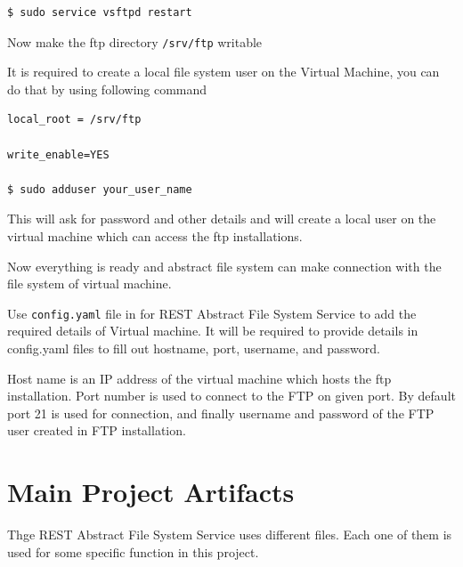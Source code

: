 \begin{verbatim}
$ sudo service vsftpd restart
\end{verbatim}



Now make the ftp directory \verb|/srv/ftp| writable 


It is required to create a local file system user on the Virtual
Machine, you can do that by using following command

\begin{verbatim}
local_root = /srv/ftp  

write_enable=YES       

$ sudo adduser your_user_name    
\end{verbatim}

This will ask for password and other details and will create a local
user on the virtual machine which can access the ftp installations.

Now everything is ready and abstract file system can make connection
with the file system of virtual machine.





Use \verb|config.yaml| file in for REST Abstract File System Service
to add the required details of Virtual machine.  It will be required
to provide details in config.yaml files to fill out hostname, port,
username, and password.


Host name is an IP address of the virtual machine which hosts the ftp 
installation. Port number is used to connect to the FTP on given port. By 
default port 21 is used for connection, and finally username and password of 
the FTP user created in FTP installation.





\section{Main Project Artifacts}

Thge REST Abstract File System Service uses different files. 
Each one of them is used for some specific function in this project.

